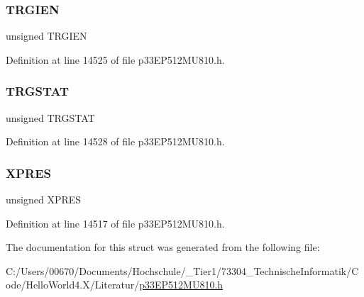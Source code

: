\subsubsection{\texorpdfstring{T\+R\+G\+I\+EN}{TRGIEN}}
{\footnotesize\ttfamily unsigned T\+R\+G\+I\+EN}



Definition at line 14525 of file p33\+E\+P512\+M\+U810.\+h.

\mbox{\label{structtag_p_w_m_c_o_n3_b_i_t_s_a57c6135a12bae69a2a2cac5ed50a4a6d}} 
\subsubsection{\texorpdfstring{T\+R\+G\+S\+T\+AT}{TRGSTAT}}
{\footnotesize\ttfamily unsigned T\+R\+G\+S\+T\+AT}



Definition at line 14528 of file p33\+E\+P512\+M\+U810.\+h.

\mbox{\label{structtag_p_w_m_c_o_n3_b_i_t_s_a6a3f824223966417e0005dbe08b1833c}} 
\subsubsection{\texorpdfstring{X\+P\+R\+ES}{XPRES}}
{\footnotesize\ttfamily unsigned X\+P\+R\+ES}



Definition at line 14517 of file p33\+E\+P512\+M\+U810.\+h.



The documentation for this struct was generated from the following file\+:\begin{DoxyCompactItemize}
\item 
C\+:/\+Users/00670/\+Documents/\+Hochschule/\+\_\+\+Tier1/73304\+\_\+\+Technische\+Informatik/\+Code/\+Hello\+World4.\+X/\+Literatur/\hyperlink{p33_e_p512_m_u810_8h}{p33\+E\+P512\+M\+U810.\+h}\end{DoxyCompactItemize}

